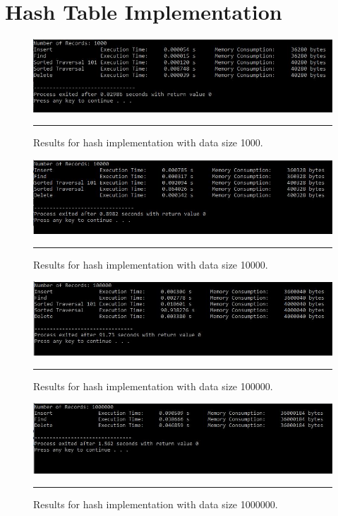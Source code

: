 \chapter{Hash Table Implementation} %
\label{Chapter3}


\begin{figure}[H]
	\centering
	\includegraphics[scale =0.7]{./Figures/hash1000.jpg}
	\rule{35em}{0.5pt}
	\caption{Results for hash implementation with data size 1000.}
	\label{fig:Hash 1000}
\end{figure}

\begin{figure}[H]
	\centering
	\includegraphics[scale =0.7]{./Figures/hash10000.jpg}
	\rule{35em}{0.5pt}
	\caption{Results for hash implementation with data size 10000.}
	\label{fig:Hash 10000}
\end{figure}

\begin{figure}[H]
	\centering
	\includegraphics[scale =0.7]{./Figures/hash100000.jpg}
	\rule{35em}{0.5pt}
	\caption{Results for hash implementation with data size 100000.}
	\label{fig:Hash 100000}
\end{figure}

\begin{figure}[H]
	\centering
	\includegraphics[scale =0.7]{./Figures/hash1000000.jpg}
	\rule{35em}{0.5pt}
	\caption{Results for hash implementation with data size 1000000.}
	\label{fig:Hash 1000000}
\end{figure}
